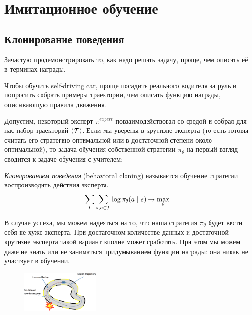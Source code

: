 \section{Имитационное обучение}\label{sec:imitationlearning}

\subsection{Клонирование поведения}

Зачастую продемонстрировать то, как надо решать задачу, проще, чем описать её в терминах награды.

\begin{example}
Чтобы обучить self-driving car, проще посадить реального водителя за руль и попросить собрать примеры траекторий, чем описать функцию награды, описывающую правила движения.
\end{example}

Допустим, некоторый эксперт $\pi^{expert}$ повзаимодействовал со средой и собрал для нас набор траекторий $(\mathcal{T})$. Если мы уверены в крутизне эксперта (то есть готовы считать его стратегию оптимальной или в достаточной степени около-оптимальной), то задача обучения собственной стратегии $\pi_{\theta}$ на первый взгляд сводится к задаче обучения с учителем:

\begin{definition}
\emph{Клонированием поведения} (behavioral cloning) называется обучение стратегии воспроизводить действия эксперта:
$$\sum_{\mathcal{T}} \sum_{s, a \in \mathcal{T}} \log \pi_{\theta}(a \mid s) \to \max_{\theta}$$
\end{definition}

В случае успеха, мы можем надеяться на то, что наша стратегия $\pi_{\theta}$ будет вести себя не хуже эксперта. При достаточном количестве данных и достаточной крутизне эксперта такой вариант вполне может сработать. При этом мы можем даже не знать или не заниматься придумыванием функции награды: она никак не участвует в обучении.

\begin{figure}
\vspace{-0.4cm}
\centering
\includegraphics[width=0.35\textwidth]{Images/behavioralclonning.png}
\vspace{-0.5cm}
\end{figure}

